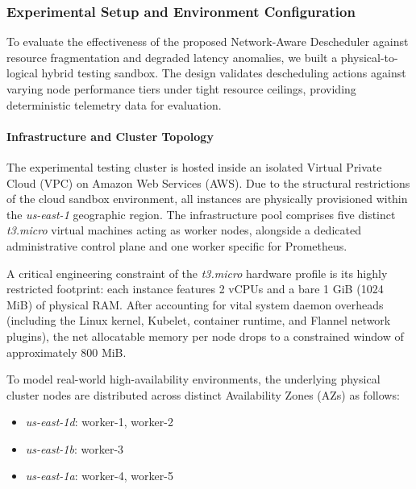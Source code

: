 \subsubsection{Experimental Setup and Environment Configuration}
\label{subsec:netaware4_experimentsetup}
To evaluate the effectiveness of the proposed Network-Aware Descheduler against resource fragmentation and degraded latency anomalies, we built a physical-to-logical hybrid testing sandbox. The design validates descheduling actions against varying node performance tiers under tight resource ceilings, providing deterministic telemetry data for evaluation.

\paragraph{Infrastructure and Cluster Topology}
\label{subsubsec:netaware4_infrasetup}
The experimental testing cluster is hosted inside an isolated Virtual Private Cloud (VPC) on Amazon Web Services (AWS). Due to the structural restrictions of the cloud sandbox environment, all instances are physically provisioned within the \textit{us-east-1} geographic region. The infrastructure pool comprises five distinct \textit{t3.micro} virtual machines acting as worker nodes, alongside a dedicated administrative control plane and one worker specific for Prometheus.

A critical engineering constraint of the \textit{t3.micro} hardware profile is its highly restricted footprint: each instance features 2 vCPUs and a bare 1 GiB (1024 MiB) of physical RAM. After accounting for vital system daemon overheads (including the Linux kernel, Kubelet, container runtime, and Flannel network plugins), the net allocatable memory per node drops to a constrained window of approximately 800 MiB.

To model real-world high-availability environments, the underlying physical cluster nodes are distributed across distinct Availability Zones (AZs) as follows:

\begin{itemize}
    \item \textit{us-east-1d}: worker-1, worker-2
    \item \textit{us-east-1b}: worker-3
    \item \textit{us-east-1a}: worker-4, worker-5
\end{itemize}

